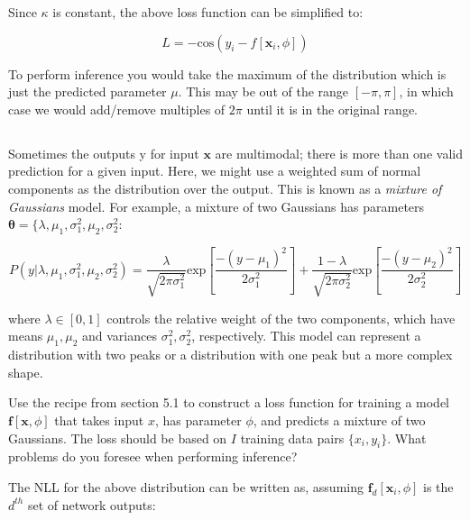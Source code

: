 \documentclass[12pt]{report}
\begin{document}
Since $\kappa$ is constant, the above loss function can be simplified to:

\begin{equation*}
    L = -\text{cos}(y_{i}-f[\mathbf{x}_{i}, \phi])
\end{equation*}

To perform inference you would take the maximum of the distribution which is just the predicted parameter $\mu$. This may be out of the range $[-\pi,\pi]$, in which case we would add/remove multiples of $2\pi$ until it is in the original range.

\subsection{}

\begin{mdframed}
    Sometimes the outputs y for input $\mathbf{x}$ are multimodal; there is more than one valid prediction for a given input. Here, we might use a weighted sum of normal components as the distribution over the output. This is known as a \textit{mixture of Gaussians} model. For example, a mixture of two Gaussians has parameters $\boldsymbol{\theta} = \{\lambda,\mu_{1}, \sigma_{1}^{2},\mu_{2}, \sigma_{2}^{2}$:

    \begin{equation*}
        P(y|\lambda,\mu_{1}, \sigma_{1}^{2},\mu_{2}, \sigma_{2}^{2}) = \frac{\lambda}{\sqrt{2\pi\sigma_{1}^{2}}}\text{exp}\left[\frac{-(y-\mu_{1})^{2}}{2\sigma_{1}^{2}}\right] + \frac{1-\lambda}{\sqrt{2\pi\sigma_{2}^{2}}}\text{exp}\left[\frac{-(y-\mu_{2})^{2}}{2\sigma_{2}^{2}}\right]
    \end{equation*}

    where $\lambda \in [0,1]$ controls the relative weight of the two components, which have means $\mu_{1}, \mu_{2}$ and variances $\sigma_{1}^{2}, \sigma_{2}^{2}$, respectively. This model can represent a distribution with two peaks or a distribution with one peak but a more complex shape.

    Use the recipe from section 5.1 to construct a loss function for training a model $\mathbf{f}[\mathbf{x}, \phi]$ that takes input $x$, has parameter $\phi$, and predicts a mixture of two Gaussians. The loss should be based on $I$ training data pairs $\{x_{i},y_{i}\}$. What problems do you foresee when performing inference?
\end{mdframed}

The NLL for the above distribution can be written as, assuming $\mathbf{f}_{d}[\mathbf{x}_{i}, \phi]$ is the $d^{th}$ set of network outputs:
\end{document}
